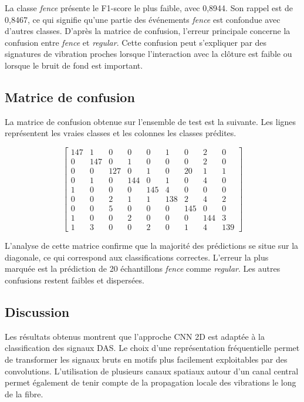 \documentclass[10pt,a4paper]{article}
\begin{document}
La classe \textit{fence} présente le F1-score le plus faible, avec 0,8944. Son rappel est de 0,8467, ce qui
signifie qu'une partie des événements \textit{fence} est confondue avec d'autres classes. D'après la matrice
de confusion, l'erreur principale concerne la confusion entre \textit{fence} et \textit{regular}. Cette
confusion peut s'expliquer par des signatures de vibration proches lorsque l'interaction avec la clôture est
faible ou lorsque le bruit de fond est important.

\subsection{Matrice de confusion}

La matrice de confusion obtenue sur l'ensemble de test est la suivante. Les lignes représentent les vraies
classes et les colonnes les classes prédites.

\[
\begin{bmatrix}
147 & 1 & 0 & 0 & 0 & 1 & 0 & 2 & 0 \\
0 & 147 & 0 & 1 & 0 & 0 & 0 & 2 & 0 \\
0 & 0 & 127 & 0 & 1 & 0 & 20 & 1 & 1 \\
0 & 1 & 0 & 144 & 0 & 1 & 0 & 4 & 0 \\
1 & 0 & 0 & 0 & 145 & 4 & 0 & 0 & 0 \\
0 & 0 & 2 & 1 & 1 & 138 & 2 & 4 & 2 \\
0 & 0 & 5 & 0 & 0 & 0 & 145 & 0 & 0 \\
1 & 0 & 0 & 2 & 0 & 0 & 0 & 144 & 3 \\
1 & 3 & 0 & 0 & 2 & 0 & 1 & 4 & 139
\end{bmatrix}
\]

L'analyse de cette matrice confirme que la majorité des prédictions se situe sur la diagonale, ce qui
correspond aux classifications correctes. L'erreur la plus marquée est la prédiction de 20 échantillons
\textit{fence} comme \textit{regular}. Les autres confusions restent faibles et dispersées.

\subsection{Discussion}

Les résultats obtenus montrent que l'approche CNN 2D est adaptée à la classification des signaux DAS. Le
choix d'une représentation fréquentielle permet de transformer les signaux bruts en motifs plus facilement
exploitables par des convolutions. L'utilisation de plusieurs canaux spatiaux autour d'un canal central
permet également de tenir compte de la propagation locale des vibrations le long de la fibre.
\end{document}
